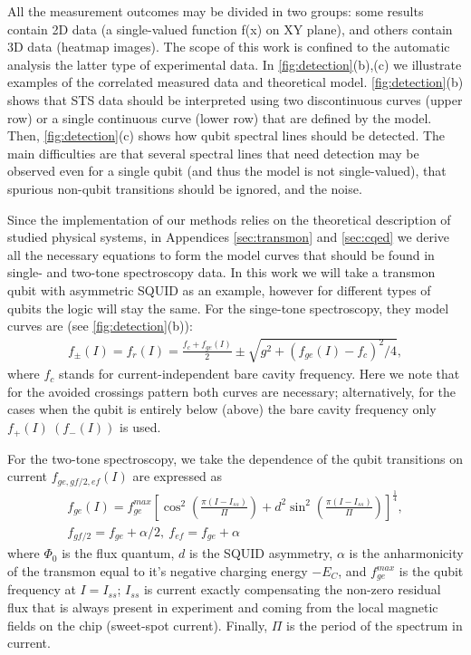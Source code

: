 \documentclass[%
 aip,
 amsmath,amssymb,
 reprint,%
]{revtex4-1}
\begin{document}
All the measurement outcomes may be divided in two groups: some results contain 2D data (a single-valued function f(x) on XY plane), and others contain 3D data (heatmap images). The scope of this work is confined to the automatic analysis the latter type of experimental data. In \autoref{fig:detection}(b),(c) we illustrate examples of the correlated measured data and theoretical model. \autoref{fig:detection}(b) shows that STS data should be interpreted using two discontinuous curves (upper row) or a single continuous curve (lower row) that are defined by the model. Then, \autoref{fig:detection}(c) shows how qubit spectral lines should be detected. The main difficulties are that several spectral lines that need detection may be observed even for a single qubit (and thus the model is not single-valued), that spurious non-qubit transitions should be ignored, and the noise.

Since the implementation of our methods relies on the theoretical description of studied physical systems, in Appendices \ref{sec:transmon} and \ref{sec:cqed} we derive all the necessary equations to form the model curves that should be found in single- and two-tone spectroscopy data. In this work we will take a transmon qubit with asymmetric SQUID as an example, however for different types of qubits the logic will stay the same. For the singe-tone spectroscopy, they model curves are (see \autoref{fig:detection}(b)):
\begin{align}
f_\pm(I) = f_r(I) = \frac{f_c + f_{ge}(I)}{2} \pm \sqrt{g^2+(f_{ge}(I) - f_c)^2/4},\label{eq:f_r}
\end{align}
where $f_c$ stands for current-independent bare cavity frequency. Here we note that for the avoided crossings pattern both curves are necessary; alternatively, for the cases when the qubit is entirely below (above) the bare cavity frequency only $ f_+(I)\ \left(f_-(I)\right)$ is used. 

For the two-tone spectroscopy, we take the dependence of the qubit transitions on current $f_{ge, gf/2, ef}(I)$ are expressed as
\begin{equation}
\begin{gathered}
f_{ge}(I) = f_{ge}^{max} \left[\cos^2\left(\frac{\pi(I-I_{ss})}{\Pi}\right)+d^2 \sin^2 \left(\frac{\pi(I-I_{ss})}{\Pi}\right)\right]^\frac{1}{4}, \\
f_{gf/2} = f_{ge} + \alpha/2,\ f_{ef}=f_{ge} + \alpha
\end{gathered}\label{eq:tr_spectrum}
\end{equation}
where $\Phi_0$ is the flux quantum, $d$ is the SQUID asymmetry, $\alpha$ is the anharmonicity of the transmon equal to it's negative charging energy $-E_C$, and $f_{ge}^{max}$ is the qubit frequency at $I = I_{ss}$; $I_{ss}$ is current exactly compensating the non-zero residual flux that is always present in experiment and coming from the local magnetic fields on the chip (sweet-spot current). Finally, $\Pi$ is the period of the spectrum in current.
\end{document}
